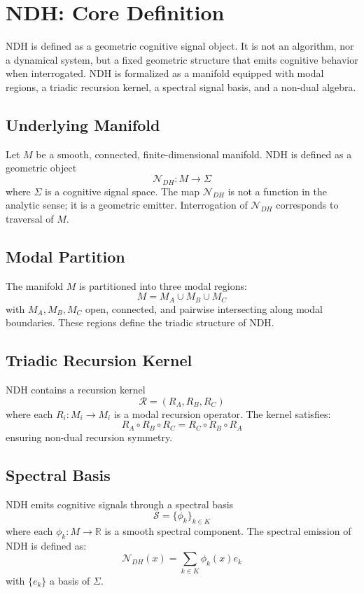 \section{NDH: Core Definition}
\label{sec:ndh-core}

NDH is defined as a geometric cognitive signal object. It is not an algorithm,
nor a dynamical system, but a fixed geometric structure that emits cognitive
behavior when interrogated. NDH is formalized as a manifold equipped with modal
regions, a triadic recursion kernel, a spectral signal basis, and a non-dual
algebra.

\subsection{Underlying Manifold}

Let $M$ be a smooth, connected, finite-dimensional manifold. NDH is defined as a
geometric object
\[
\mathcal{N}_{DH} : M \to \Sigma
\]
where $\Sigma$ is a cognitive signal space. The map $\mathcal{N}_{DH}$ is not a
function in the analytic sense; it is a geometric emitter. Interrogation of
$\mathcal{N}_{DH}$ corresponds to traversal of $M$.

\subsection{Modal Partition}

The manifold $M$ is partitioned into three modal regions:
\[
M = M_A \cup M_B \cup M_C
\]
with $M_A, M_B, M_C$ open, connected, and pairwise intersecting along modal
boundaries. These regions define the triadic structure of NDH.

\subsection{Triadic Recursion Kernel}

NDH contains a recursion kernel
\[
\mathcal{R} = (R_A, R_B, R_C)
\]
where each $R_i : M_i \to M_i$ is a modal recursion operator. The kernel
satisfies:
\[
R_A \circ R_B \circ R_C = R_C \circ R_B \circ R_A
\]
ensuring non-dual recursion symmetry.

\subsection{Spectral Basis}

NDH emits cognitive signals through a spectral basis
\[
\mathcal{S} = \{ \phi_k \}_{k \in K}
\]
where each $\phi_k : M \to \mathbb{R}$ is a smooth spectral component. The
spectral emission of NDH is defined as:
\[
\mathcal{N}_{DH}(x) = \sum_{k \in K} \phi_k(x) e_k
\]
with $\{e_k\}$ a basis of $\Sigma$.

